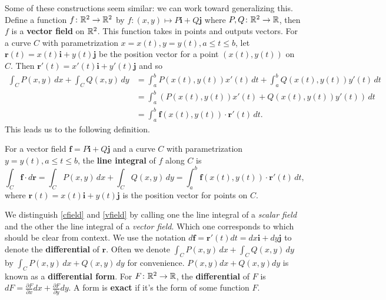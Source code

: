 Some of these constructions seem similar: we can work toward generalizing this. Define a function $f \colon \mathbb{R}^2 \to \mathbb{R}^2$ by $f \colon (x,y) \mapsto P \mathbf i+Q \mathbf j$ where $P,Q \colon \mathbb{R}^2 \to \mathbb{R}$, then $f$ is a \textbf{vector field} on $\mathbb{R}^2$. This function takes in points and outputs vectors. For a curve $C$ with parametrization $x=x(t),y=y(t),a\leq t \leq b$, let $\mathbf r(t)=x(t)\mathbf i+y(t)\mathbf j$ be the position vector for a point $(x(t),y(t))$ on $C$. Then $\mathbf r'(t)=x'(t)\mathbf i +y'(t)\mathbf j$ and so 
\begin{align*}
    \int_{C}^{} P(x,y) \, dx + \int_{C}^{} Q(x,y)\, dy&=\int_{a}^{b} P(x(t),y(t))x'(t) \, dt+\int_{a}^{b} Q(x(t),y(t))y'(t) \, dt\\
                                                      &=\int_{a}^{b} \left( P(x(t),y(t))x'(t)+Q(x(t),y(t))y'(t) \right)  \, dt\\
                                                      &= \int_{a}^{b} \mathbf f(x(t),y(t))\cdot \mathbf r'(t) \, dt.
\end{align*}
This leads us to the following definition.
\begin{definition}[]\label{vfield}
    For a vector field $\mathbf f=P \mathbf i +Q \mathbf j$ and a curve $C$ with parametrization $y=y(t),a\leq t \leq b$, the \textbf{line integral} of $f$ along $C$ is \[
        \int_{C}^{} \mathbf f \cdot  d\mathbf r=\int_{C}^{} P(x,y) \, dx+\int_{C}^{} Q(x,y) \, dy=\int_{a}^{b} \mathbf f(x(t),y(t))\cdot \mathbf r'(t) \, dt,
    \] where $\mathbf r(t)=x(t)\mathbf i+y(t)\mathbf j$ is the position vector for points on $C$.
\end{definition}
We distinguish \cref{cfield} and \cref{vfield} by calling one the line integral of a \emph{scalar field} and the other the line integral of a \emph{vector field}. Which one corresponds to which should be clear from context. We use the notation $d\mathbf f=\mathbf r'(t)dt=dx \mathbf i+dy\mathbf j$ to denote the \textbf{differential} of $\mathbf r$. Often we denote $\int_{C}^{} P(x,y) \, dx+\int_{C}^{} Q(x,y) \, dy$ by $\int_{C}^{} P(x,y) \, dx+ Q(x,y)\, dy$ for convenience. $P(x,y)dx+Q(x,y)dy$ is known as a \textbf{differential form}. For $F \colon \mathbb{R}^2 \to \mathbb{R}$, the \textbf{differential} of $F$ is $dF= \frac{\partial F}{\partial x}dx+ \frac{\partial F}{\partial y}dy$. A form is \textbf{exact} if it's the form of some function $F$.

